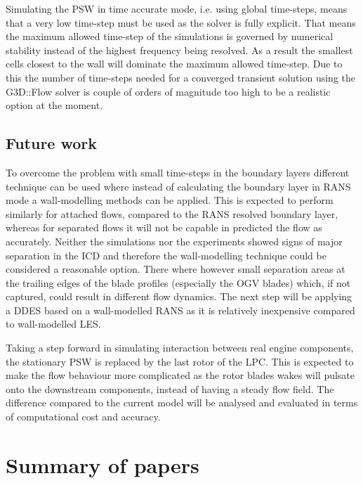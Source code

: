 Simulating the PSW in time accurate mode, i.e. using global time-steps, means that a very low time-step must be used as the solver is fully explicit. That means the maximum allowed time-step of the simulations is governed by numerical stability instead of the highest frequency being resolved. As a result the smallest cells closest to the wall will dominate the maximum allowed time-step. Due to this the number of time-steps needed for a converged transient solution using the G3D::Flow solver is couple of orders of magnitude too high to be a realistic option at the moment.

\section{Future work}
To overcome the problem with small time-steps in the boundary layers different technique can be used where instead of calculating the boundary layer in RANS mode a wall-modelling methods can be applied. This is expected to perform similarly for attached flows, compared to the RANS resolved boundary layer, whereas for separated flows it will not be capable in predicted the flow as accurately. Neither the simulations nor the experiments showed signs of major separation in the ICD and therefore the wall-modelling technique could be considered a reasonable option. There where however small separation areas at the trailing edges of the blade profiles (especially the OGV blades) which, if not captured, could result in different flow dynamics. The next step will be applying a DDES based on a wall-modelled RANS as it is relatively inexpensive compared to wall-modelled LES.

Taking a step forward in simulating interaction between real engine components, the stationary PSW is replaced by the last rotor of the LPC. This is expected to make the flow behaviour more complicated as the rotor blades wakes will pulsate onto the downstream components, instead of having a steady flow field. The difference compared to the current model will be analysed and evaluated in terms of computational cost and accuracy.


%           
\chapter{Summary of papers\label{ch:summary}}

